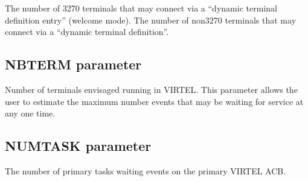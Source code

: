 \documentclass[letterpaper,10pt,english]{sphinxmanual}
\begin{document}
\sphinxAtStartPar
{} \sphinxhyphen{} The number of 3270 terminals that may connect via a “dynamic terminal definition entry” (welcome mode).
 \sphinxhyphen{} The number of non\sphinxhyphen{}3270 terminals that may connect via a “dynamic terminal definition”.

\ignorespaces 

\subsection{NBTERM parameter}
\label{\detokenize{Installation_Guide:nbterm-parameter}}\label{\detokenize{Installation_Guide:index-96}}
\begin{sphinxVerbatim}[commandchars=\\\{\}]
 
\end{sphinxVerbatim}

\sphinxAtStartPar
{} \sphinxhyphen{} Number of terminals envisaged running in VIRTEL. This parameter allows the user to estimate the maximum number events that may be waiting for service at any one time.

\ignorespaces 

\subsection{NUMTASK parameter}
\label{\detokenize{Installation_Guide:numtask-parameter}}\label{\detokenize{Installation_Guide:index-97}}
\begin{sphinxVerbatim}[commandchars=\\\{\}]
 
\end{sphinxVerbatim}

\sphinxAtStartPar
{} \sphinxhyphen{} The number of primary tasks waiting events on the primary VIRTEL ACB.

\ignorespaces 
\end{document}
